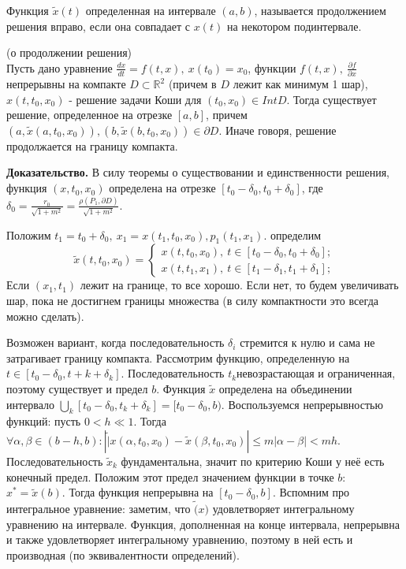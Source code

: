 \begin{defin}
Функция $\tilde x(t)$ определенная на интервале $(a,b)$, называется 
продолжением решения вправо, если она совпадает с $x(t)$ на некотором
подинтервале.
\end{defin}


\begin{theor}
    (о продолжении решения)\\
    Пусть дано уравнение $\frac{dx}{dt}=f(t,x),~x(t_0)=x_0$, 
    функции $f(t,x),~\frac{\partial f}{\partial x}$ непрерывны на компакте
    $D\subset \mathbb{R}^2$ (причем в $D$ лежит как минимум 1 шар),
    $x(t,t_0,x_0)$ - решение задачи Коши для  $(t_0,x_0)\in Int D$. 
    Тогда существует решение, определенное на отрезке $[a,b]$, причем
     $(a,\tilde x(a,t_0,x_0)),(b,\tilde x(b,t_0,x_0))\in \partial D$.
     Иначе говоря, решение продолжается на границу компакта.
\end{theor}
\textbf{Доказательство.} В силу теоремы о существовании и единственности 
решения, функция $(x,t_0,x_0)$ определена на отрезке $[t_0-\delta_0,
t_0+\delta_0]$, где $\delta_0=\frac{r_0}{\sqrt{1+m^2} }= \frac{\rho(P_1,
\partial D)}{\sqrt{1+m^2} }$. 

Положим $t_1=t_0+\delta_0,~x_1=x(t_1,t_0,x_0),p_1(t_1,x_1)$. 
определим 
$$\tilde x(t,t_0,x_0)=\begin{cases}
    x(t,t_0,x_0),~t\in [t_0-\delta_0,t_0+\delta_0];\\
    x(t,t_1,x_1),~t\in [t_1-\delta_1,t_1+\delta_1];
\end{cases}$$
Если $(x_1,t_1)$ лежит на границе, то все хорошо. Если нет, то будем 
увеличивать шар, пока не достигнем границы множества (в силу компактности 
это всегда можно сделать). 

Возможен вариант, когда последовательность $\delta_i$ стремится к нулю и 
сама не затрагивает границу компакта. Рассмотрим функцию, определенную 
на $t\in [t_0-\delta_0,t+k+\delta_k]$. Последовательность 
$t_k$невозрастающая и ограниченная, поэтому существует и предел 
$b$. Функция $\tilde x$  определена на объединении интервало
$\bigcup\limits_{k}[t_0-\delta_0,t_k+\delta_k]=[t_0-\delta_0,b)$.
Воспользуемся непрерывностью функций: пусть $0<h\ll1$.
Тогда $\forall \alpha,\beta\in (b-h,b):|\tilde| x(\alpha,t_0,x_0)-
\tilde x(\beta,t_0,x_0)|\leqslant m|\alpha-\beta|<mh$. 
Последовательность $\tilde x_k$ фундаментальна, значит по критерию Коши 
у неё есть конечный предел. Положим этот предел значением функции 
в точке $b$:  $x^*=\tilde x(b)$. Тогда функция непрерывна на $[t_0-\delta_0,
b]$. Вспомним про интегральное уравнение: заметим, что $\tilde(x)$ 
удовлетворяет интегральному уравнению на интервале. Функция, дополненная
на конце интервала, непрерывна и также удовлетворяет интегральному 
уравнению, поэтому в ней есть и производная (по эквивалентности
определений).

